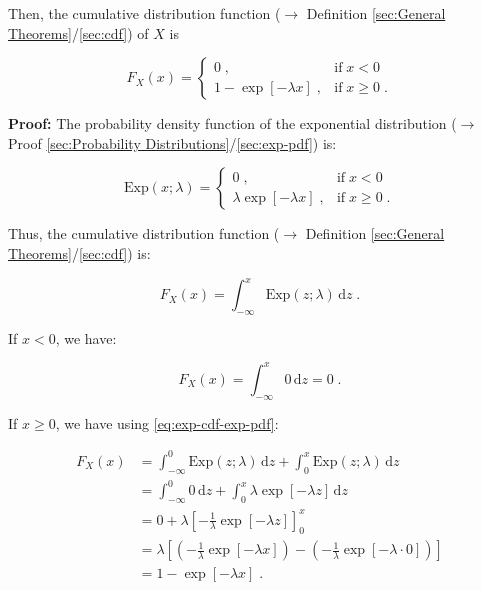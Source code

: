 \documentclass[a4paper,12pt]{book}
\begin{document}
Then, the cumulative distribution function ($\rightarrow$ Definition \ref{sec:General Theorems}/\ref{sec:cdf}) of $X$ is

\begin{equation} \label{eq:exp-cdf-exp-cdf}
F_X(x) = \left\{
\begin{array}{rl}
0 \; , & \text{if} \; x < 0 \\
1 - \exp[-\lambda x] \; , & \text{if} \; x \geq 0 \; .
\end{array}
\right.
\end{equation}


\vspace{1em}
\textbf{Proof:}  The probability density function of the exponential distribution ($\rightarrow$ Proof \ref{sec:Probability Distributions}/\ref{sec:exp-pdf}) is:

\begin{equation} \label{eq:exp-cdf-exp-pdf}
\mathrm{Exp}(x; \lambda) = \left\{
\begin{array}{rl}
0 \; , & \text{if} \; x < 0 \\
\lambda \exp[-\lambda x] \; , & \text{if} \; x \geq 0 \; .
\end{array}
\right.
\end{equation}

Thus, the cumulative distribution function ($\rightarrow$ Definition \ref{sec:General Theorems}/\ref{sec:cdf}) is:

\begin{equation} \label{eq:exp-cdf-exp-cdf-s1}
F_X(x) = \int_{-\infty}^{x} \mathrm{Exp}(z; \lambda) \, \mathrm{d}z \; .
\end{equation}

If $x < 0$, we have:

\begin{equation} \label{eq:exp-cdf-exp-cdf-s2a}
F_X(x) = \int_{-\infty}^{x} 0 \, \mathrm{d}z = 0 \; .
\end{equation}

If $x \geq 0$, we have using \eqref{eq:exp-cdf-exp-pdf}:

\begin{equation} \label{eq:exp-cdf-exp-cdf-s2b}
\begin{split}
F_X(x) &= \int_{-\infty}^{0} \mathrm{Exp}(z; \lambda) \, \mathrm{d}z + \int_{0}^{x} \mathrm{Exp}(z; \lambda) \, \mathrm{d}z \\
&= \int_{-\infty}^{0} 0 \, \mathrm{d}z + \int_{0}^{x} \lambda \exp[-\lambda z] \, \mathrm{d}z \\
&= 0 + \lambda \left[ -\frac{1}{\lambda} \exp[-\lambda z] \right]_{0}^{x} \\
&= \lambda \left[ \left( -\frac{1}{\lambda} \exp[-\lambda x] \right) - \left( -\frac{1}{\lambda} \exp[-\lambda \cdot 0] \right) \right] \\
&= 1 - \exp[-\lambda x] \; .
\end{split}
\end{equation}
\end{document}
